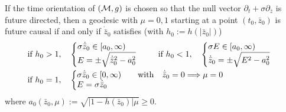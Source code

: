 \begin{proposition}\label{geodesicequationslema}
If the time orientation of $({\mathcal M},g)$ is chosen so that
the null vector 
$\partial_t +  \sigma  \partial_{{\bar z}}$
is future directed, then a geodesic with $\mu=0,1$ 
starting at a point $(t_0,{\bar z}_0)$ is future causal 
if and only if $\dot{{\bar z}}_0$ satisfies (with 
 $h_0 := h(|{\bar z}_0|)$)
 \begin{align*}
& \mbox{if }  h_0>1, \quad
\begin{cases}
\begin{aligned}
& \sigma \dot{{\bar z}}_0 \in [a_0, \infty) \\
&E = \pm \sqrt{\dot{{\bar z}}_0^2 - a_0^2 }
\end{aligned}
\end{cases}
\hspace{0.5cm}
\mbox{if }  h_0<1,  \quad
\begin{cases}
 \begin{aligned}
&  \sigma E \in [a_0, \infty) \\
&\dot{{\bar z}}_0 = \pm \sqrt{E^2 - a_0^2} \\
\end{aligned}
\end{cases}
\\
& \mbox{if }  h_0=1,  \quad  
\begin{cases}  
\begin{aligned}
& \sigma \dot{{\bar z}}_0 \in [0, \infty)  \quad \quad \mbox{with} \quad
\dot{{\bar z}}_0 =0 \Longrightarrow
\mu  =0 \\
&E =  \sigma \dot{{\bar z}}_0
\end{aligned}
\end{cases}
\end{align*}
where $a_0 ({\bar z}_0,\mu) := \sqrt{\left | 1-  h({\bar z}_0) \right | \mu } \geq 0$.
\end{proposition}
